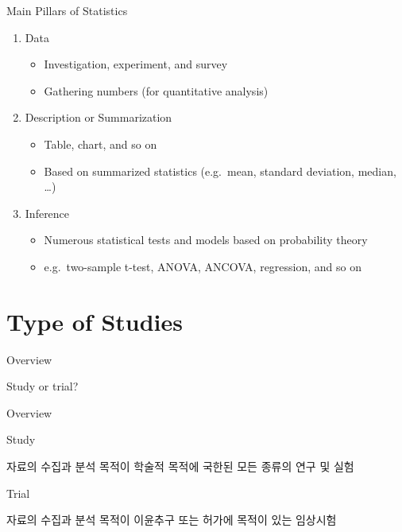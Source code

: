 \documentclass[9pt,ignorenonframetext,xcolor=dvipsnames]{beamer}
\providecommand{\tightlist}{%
  \setlength{\itemsep}{0pt}\setlength{\parskip}{0pt}}
\newlength{\wideitemsep}
\let\olditem\item
\renewcommand{\item}{\setlength{\itemsep}{\wideitemsep}\olditem}
\begin{document}
\begin{frame}{Main Pillars of Statistics}

\LARGE

\begin{enumerate}
\def\labelenumi{\arabic{enumi}.}
\tightlist
\item
  Data

  \begin{itemize}
  \tightlist
  \item
    Investigation, experiment, and survey
  \item
    Gathering numbers (for quantitative analysis)
  \end{itemize}
\item
  Description or Summarization

  \begin{itemize}
  \tightlist
  \item
    Table, chart, and so on
  \item
    Based on summarized statistics (e.g.~mean, standard deviation,
    median, \ldots{})
  \end{itemize}
\item
  Inference

  \begin{itemize}
  \tightlist
  \item
    Numerous statistical tests and models based on probability theory
  \item
    e.g.~two-sample t-test, ANOVA, ANCOVA, regression, and so on
  \end{itemize}
\end{enumerate}

\end{frame}

\section{Type of Studies}\label{type-of-studies}

\begin{frame}{Overview}

\LARGE{Study or trial?}

\end{frame}

\begin{frame}{Overview}

\begin{block}{Study}

자료의 수집과 분석 목적이 학술적 목적에 국한된 모든 종류의 연구 및 실험

\end{block}

\begin{block}{Trial}

자료의 수집과 분석 목적이 이윤추구 또는 허가에 목적이 있는 임상시험

\end{block}

\end{frame}
\end{document}
